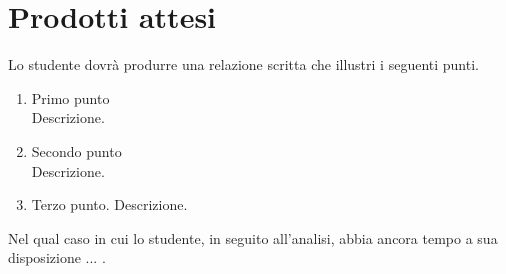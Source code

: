 \section*{Prodotti attesi}
Lo studente dovrà produrre una relazione scritta che illustri i seguenti punti.
\begin{enumerate}
    \item Primo punto \\
    Descrizione. 
    
    \item Secondo punto \\
    Descrizione.
    
    \item Terzo punto.
    Descrizione.
\end{enumerate}

Nel qual caso in cui lo studente, in seguito all'analisi, abbia ancora tempo a sua disposizione ... .
